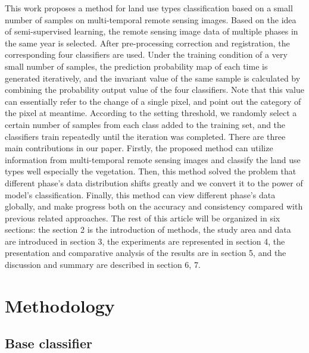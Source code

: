 \documentclass{isprs} %
\begin{document}
This work proposes a method for land use types classification based on a small number of samples on multi-temporal remote sensing images. Based on the idea of semi-supervised learning, the remote sensing image data of multiple phases in the same year is selected. After pre-processing correction and registration, the corresponding four classifiers are used. Under the training condition of a very small number of samples, the prediction probability map of each time is generated iteratively, and the invariant value of the same sample is calculated by combining the probability output value of the four classifiers. Note that this value can essentially refer to the change of a single pixel, and point out the category of the pixel at meantime. According to the setting threshold, we randomly select a certain number of samples from each class added to the training set, and the classifiers train repeatedly until the iteration was completed.
There are three main contributions in our paper. Firstly, the proposed method can utilize information from multi-temporal remote sensing images and classify the land use types well especially the vegetation. Then, this method solved the problem that different phase’s data distribution shifts greatly and we convert it to the power of model’s classification. Finally, this method can view different phase’s data globally, and make progress both on the accuracy and consistency compared with previous related approaches.
The rest of this article will be organized in six sections: the section 2 is the introduction of methods, the study area and data are introduced in section 3, the experiments are represented in section 4, the presentation and comparative analysis of the results are in section 5, and the discussion and summary are described in section 6, 7.


\section{Methodology}\label{sec:Methodology}

\subsection{Base classifier}\label{Base classifier}
\end{document}
